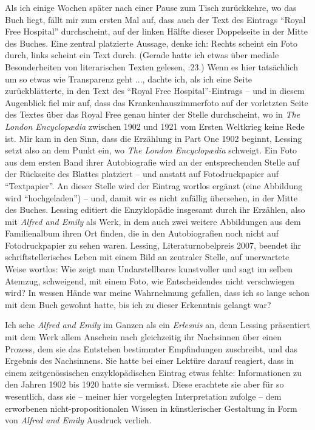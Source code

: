 \documentclass[fontsize=12pt]{scrartcl}
\begin{document}
Als ich einige Wochen sp\"ater nach einer Pause zum Tisch zur\"uckkehre, wo das Buch liegt, f\"allt mir zum ersten Mal auf, dass auch der Text des Eintrags "`Royal Free Hospital"' durchscheint, auf der linken H\"alfte dieser Doppelseite in der Mitte des Buches. Eine zentral platzierte Aussage, denke ich: Rechts scheint ein Foto durch, links scheint ein Text durch. (Gerade hatte ich etwas \"uber mediale Besonderhei\-ten von li\-te\-ra\-rischen Texten gelesen, \cite{Hillenbach2012}:23.) Wenn es \mbox{hier} tats\"achlich um so etwas wie Transparenz geht ..., dachte ich, als ich eine Seite zur\"uckbl\"atterte, in den Text des "`Royal Free Hospital"'-Eintrags -- und in diesem Augenblick fiel mir auf, dass das Kranken\-hauszimmer\-foto auf der vorletzten Seite des Textes \"uber das Royal Free genau hinter der Stelle durchscheint, wo in \textit{The London Encyclop{\ae}dia} zwischen 1902 und 1921 vom Ersten Weltkrieg keine Rede ist. Mir kam in den Sinn, dass die Erz\"ahlung in Part One 1902 beginnt, Lessing setzt also an dem Punkt ein, wo \textit{The London Encyclop{\ae}dia} schweigt. Ein Foto aus dem ersten Band ihrer Autobiografie wird an der entsprechenden Stelle auf der R\"uckseite des Blattes platziert -- und anstatt auf Fotodruckpapier auf "`Textpapier"'. An dieser Stelle wird der Eintrag wortlos erg\"anzt (eine Abbildung wird "`hochgeladen"') -- und, damit wir es nicht zuf\"allig \"ubersehen, in der Mitte des Buches. Lessing editiert die Enzyklop\"adie insgesamt durch ihr Erz\"ahlen, also mit \textit{Alfred and Emily} als Werk, in dem auch zwei weitere Abbildungen aus dem Familienalbum ihren Ort finden, die in den Autobiografien noch nicht auf Fotodruckpapier zu sehen waren. Lessing, Li\-te\-ra\-tur\-nobelpreis 2007, beendet ihr schriftstellerisches Leben mit einem Bild an zentraler Stelle, auf unerwartete Weise wortlos: Wie zeigt man Undarstellbares kunstvoller und sagt im selben Atemzug, schweigend, mit einem Foto, wie Entscheidendes nicht verschwiegen wird? In wessen H\"ande war meine Wahrnehmung gefallen, dass ich so lange schon mit dem Buch gewohnt hatte, bis ich zu dieser Erkenntnis gelangt war?

Ich sehe \textit{Alfred and Emily} im Ganzen als ein \textit{Erlesnis} an, denn Lessing pr\"asentiert mit dem Werk allem Anschein nach gleichzeitig ihr Nachsinnen \"uber einen Prozess, dem sie das Entstehen bestimmter Emp\-fin\-dun\-gen zuschreibt, und das Ergebnis des Nachsinnens. Sie hatte bei einer Lekt\"ure darauf reagiert, dass in einem zeitgen\"ossischen enzyklop\"adischen Eintrag etwas fehlte: Informationen zu den Jahren 1902 bis 1920 hatte sie vermisst. Diese erachtete sie aber f\"ur so we\-sent\-lich, dass sie -- meiner \mbox{hier} vorgelegten Interpretation zufolge -- dem erworbenen nicht-propositio\-na\-len Wissen in k\"unstlerischer Gestaltung in Form von \textit{Alfred and Emily} Ausdruck verlieh. 
\end{document}
